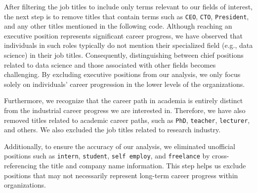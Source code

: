 \documentclass[11pt,]{article}
\begin{document}
After filtering the job titles to include only terms relevant to our
fields of interest, the next step is to remove titles that contain terms
such as \texttt{CEO}, \texttt{CTO}, \texttt{President}, and any other
titles mentioned in the following code. Although reaching an executive
position represents significant career progress, we have observed that
individuals in such roles typically do not mention their specialized
field (e.g., data science) in their job titles. Consequently,
distinguishing between chief positions related to data science and those
associated with other fields becomes challenging. By excluding executive
positions from our analysis, we only focus solely on individuals' career
progression in the lower levels of the organizations.

Furthermore, we recognize that the career path in academia is entirely
distinct from the industrial career progress we are interested in.
Therefore, we have also removed titles related to academic career paths,
such as \texttt{PhD}, \texttt{teacher}, \texttt{lecturer}, and others.
We also excluded the job titles related to research industry.

Additionally, to ensure the accuracy of our analysis, we eliminated
unofficial positions such as \texttt{intern}, \texttt{student},
\texttt{self\ employ}, and \texttt{freelance} by cross-referencing the
title and company name information. This step helps us exclude positions
that may not necessarily represent long-term career progress within
organizations.
\end{document}
